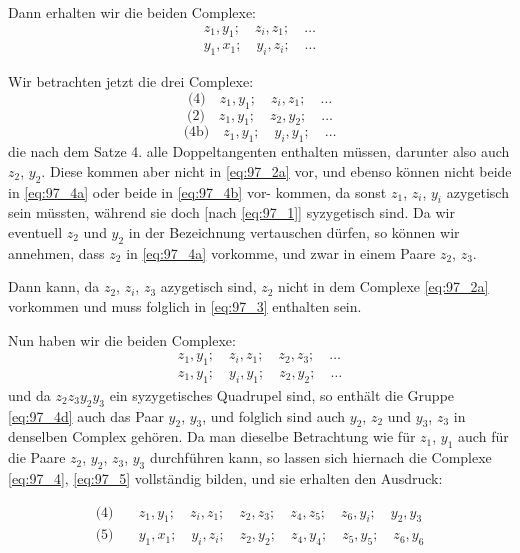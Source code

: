 \documentclass[12pt,a4paper]{article}
\theoremstyle{plain}
\theoremstyle{definition}
\theoremstyle{remark}
\begin{document}
Dann erhalten wir die beiden Complexe:
\begin{align}
z_1, y_1; \quad z_i, z_1; \quad \ldots \label{eq:97_4} \\
y_1, x_1; \quad y_i, z_i; \quad \ldots \label{eq:97_5}
\end{align}

Wir betrachten jetzt die drei Complexe:
\begin{equation}\label{eq:97_4a}
\text{(4)} \quad z_1, y_1; \quad z_i, z_1; \quad \ldots
\end{equation}
\begin{equation}\label{eq:97_2a}
\text{(2)} \quad z_1, y_1; \quad z_2, y_2; \quad \ldots
\end{equation}
\begin{equation}\label{eq:97_4b}
\text{(4b)} \quad z_1, y_1; \quad y_i, y_1; \quad \ldots
\end{equation}
die nach dem Satze 4. alle Doppeltangenten enthalten müssen,
darunter also auch $z_2$, $y_2$. Diese kommen aber nicht in \eqref{eq:97_2a} vor,
und ebenso können nicht beide in \eqref{eq:97_4a} oder beide in \eqref{eq:97_4b} vor-
kommen, da sonst $z_1$, $z_i$, $y_i$ azygetisch sein müssten, während
sie doch [nach \eqref{eq:97_1}] syzygetisch sind. Da wir eventuell $z_2$ und $y_2$
in der Bezeichnung vertauschen dürfen, so können wir annehmen,
dass $z_2$ in \eqref{eq:97_4a} vorkomme, und zwar in einem Paare $z_2$, $z_3$.

Dann kann, da $z_2$, $z_i$, $z_3$ azygetisch sind, $z_2$ nicht in dem
Complexe \eqref{eq:97_2a} vorkommen und muss folglich in \eqref{eq:97_3} enthalten sein.

Nun haben wir die beiden Complexe:
\begin{align}
z_1, y_1; \quad z_i, z_1; \quad z_2, z_3; \quad \ldots \label{eq:97_4c} \\
z_1, y_1; \quad y_i, y_1; \quad z_2, y_2; \quad \ldots \label{eq:97_4d}
\end{align}
und da $z_2 z_3 y_2 y_3$ ein syzygetisches Quadrupel sind, so enthält
die Gruppe \eqref{eq:97_4d} auch das Paar $y_2$, $y_3$, und folglich sind auch
$y_2$, $z_2$ und $y_3$, $z_3$ in denselben Complex gehören. Da man dieselbe
Betrachtung wie für $z_1$, $y_1$ auch für die Paare $z_2$, $y_2$, $z_3$, $y_3$
durchführen kann, so lassen sich hiernach die Complexe \eqref{eq:97_4}, \eqref{eq:97_5}
vollständig bilden, und sie erhalten den Ausdruck:

\begin{equation}\label{eq:97_4e}
\begin{aligned}
\text{(4)} \quad &z_1, y_1; \quad z_i, z_1; \quad z_2, z_3; \quad z_4, z_5; \quad z_6, y_i; \quad y_2, y_3 \\
\text{(5)} \quad &y_1, x_1; \quad y_i, z_i; \quad z_2, y_2; \quad z_4, y_4; \quad z_5, y_5; \quad z_6, y_6
\end{aligned}
\end{equation}
\end{document}
